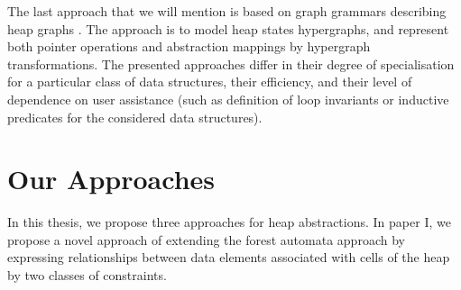 The last approach that we will mention is based on graph grammars describing heap graphs \cite{Jonathan:Shape, Jonathan:Grammars}.  The approach is to model heap states hypergraphs, and represent both pointer operations and abstraction mappings by hypergraph transformations. The presented approaches differ in their degree of specialisation for a particular class of data structures, their efficiency, and their level of dependence on user assistance (such as definition of loop invariants or inductive predicates for the considered data structures).
  
\section*{Our Approaches}
In this thesis, we propose three approaches for heap abstractions. In paper I, we propose a novel approach of extending the forest automata approach \cite{foresterfull} by expressing relationships between data elements associated with cells of the heap %
by two classes of constraints.


